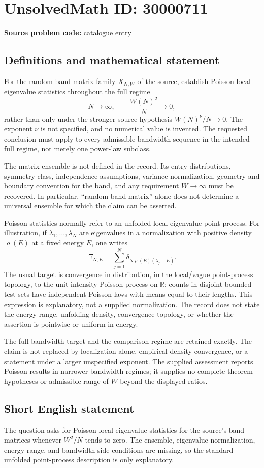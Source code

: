 \documentclass[11pt]{article}
\newcommand{\R}{\mathbb{R}}
\begin{document}
\section*{UnsolvedMath ID: 30000711}
\textbf{Source problem code:} catalogue entry
\subsection{Definitions and mathematical statement}
For the random band-matrix family $X_{N,W}$ of the source, establish Poisson local eigenvalue statistics throughout the full regime
\[
 N\longrightarrow\infty,\qquad\frac{W(N)^2}{N}\longrightarrow0,
\]
rather than only under the stronger source hypothesis $W(N)^\nu/N\to0$. The exponent $\nu$ is not specified, and no numerical value is invented. The requested conclusion must apply to every admissible bandwidth sequence in the intended full regime, not merely one power-law subclass.

The matrix ensemble is not defined in the record. Its entry distributions, symmetry class, independence assumptions, variance normalization, geometry and boundary convention for the band, and any requirement $W\to\infty$ must be recovered. In particular, ``random band matrix'' alone does not determine a universal ensemble for which the claim can be asserted.

Poisson statistics normally refer to an unfolded local eigenvalue point process. For illustration, if $\lambda_1,\ldots,\lambda_N$ are eigenvalues in a normalization with positive density $\varrho(E)$ at a fixed energy $E$, one writes
\[
 \Xi_{N,E}=\sum_{j=1}^N
       \delta_{N\varrho(E)(\lambda_j-E)}.
\]
The usual target is convergence in distribution, in the local/vague point-process topology, to the unit-intensity Poisson process on $\R$: counts in disjoint bounded test sets have independent Poisson laws with means equal to their lengths. This expression is explanatory, not a supplied normalization. The record does not state the energy range, unfolding density, convergence topology, or whether the assertion is pointwise or uniform in energy.

The full-bandwidth target and the comparison regime are retained exactly. The claim is not replaced by localization alone, empirical-density convergence, or a statement under a larger unspecified exponent. The supplied assessment reports Poisson results in narrower bandwidth regimes; it supplies no complete theorem hypotheses or admissible range of $W$ beyond the displayed ratios.
\subsection{Short English statement}
The question asks for Poisson local eigenvalue statistics for the source's band matrices whenever $W^2/N$ tends to zero. The ensemble, eigenvalue normalization, energy range, and bandwidth side conditions are missing, so the standard unfolded point-process description is only explanatory.
\end{document}
